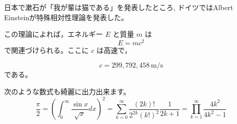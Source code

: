 \documentclass{jsarticle}
\begin{document}
日本で漱石が「我が輩は猫である」を発表したところ,
ドイツではAlbert Einsteinが特殊相対性理論を発表した。

この理論によれば，エネルギー $E$ と質量 $m$ は
\begin{equation}
	E = mc^{2}
\end{equation}
で関連づけられる。ここに $c$ は高速で，

\begin{equation}
	c = 299{,}792{,}458 \, \mathrm{m/s}
\end{equation}
である。

次のような数式も綺麗に出力出来ます。
\[
	\frac{\pi}{2} =
	\left(\int_{0}^{\infty} \frac{\sin x}{\sqrt{x}} dx \right) ^ 2 =
	\sum_{k=0}^{\infty} \frac{(2k)!}{2^{2k}(k!)^2} \frac{1}{2k+1} =
	\prod_{k=1}^{\infty} \frac{4k^2}{4k^2 - 1}
\]
\end{document}
